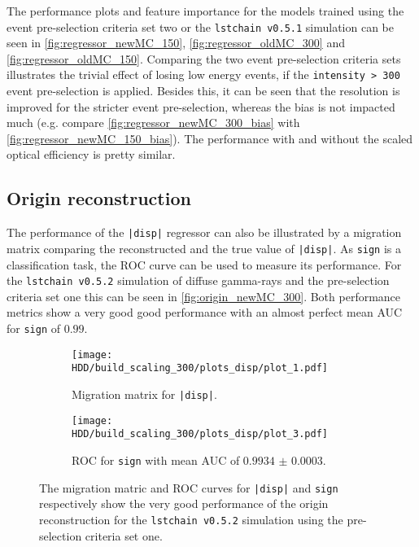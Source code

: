 The performance plots and feature importance for the models trained using the event pre-selection criteria set two or the \texttt{lstchain v0.5.1} simulation 
can be seen in \autoref{fig:regressor_newMC_150}, \autoref{fig:regressor_oldMC_300} and \autoref{fig:regressor_oldMC_150}.
Comparing the two event pre-selection criteria sets illustrates the trivial effect of losing low energy events, if the \texttt{intensity > 300} event pre-selection is applied.
Besides this, it can be seen that the resolution is improved for the stricter event pre-selection, whereas the bias is not impacted much 
(e.g. compare \autoref{fig:regressor_newMC_300_bias} with \autoref{fig:regressor_newMC_150_bias}).
The performance with and without the scaled optical efficiency is pretty similar.


\subsection{Origin reconstruction}
The performance of the \texttt{|disp|} regressor can also be illustrated by a migration matrix comparing the reconstructed and the true value of \texttt{|disp|}.
As \texttt{sign} is a classification task, the ROC curve can be used to measure its performance.
For the \texttt{lstchain v0.5.2} simulation of diffuse gamma-rays and the pre-selection criteria set one this can be seen in \autoref{fig:origin_newMC_300}.
Both performance metrics show a very good good performance with an almost perfect mean AUC for \texttt{sign} of $\num{0.99}$.
\begin{figure}
    \centering
    \begin{subfigure}{0.49\textwidth}
        \centering
        \texttt{[image: HDD/build\_scaling\_300/plots\_disp/plot\_1.pdf]}
        \caption{Migration matrix for \texttt{|disp|}.}
    \end{subfigure}
    \hfill
    \begin{subfigure}{0.49\textwidth}
        \centering
        \texttt{[image: HDD/build\_scaling\_300/plots\_disp/plot\_3.pdf]}
        \caption{ROC for \texttt{sign} with mean AUC of $\num{0.9934(3)}$.}    
        \label{fig:origin_newMC_300_roc}  
    \end{subfigure}
    \caption{The migration matric and ROC curves for \texttt{|disp|} and \texttt{sign} respectively show the very good performance of the origin reconstruction
        for the \texttt{lstchain v0.5.2} simulation using the pre-selection criteria set one.
    }
    \label{fig:origin_newMC_300}
\end{figure}

